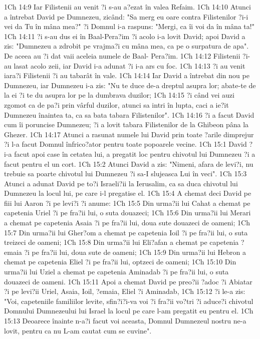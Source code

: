 1Ch 14:9  Iar Filistenii au venit ?i s-au a?ezat în valea Refaim.
1Ch 14:10  Atunci a întrebat David pe Dumnezeu, zicând: "Sa merg eu oare contra Filistenilor ?i-i vei da Tu în mâna mea?" ?i Domnul i-a raspuns: "Mergi, ca îi voi da în mâna ta!"
1Ch 14:11  ?i s-au dus ei în Baal-Pera?im ?i acolo i-a lovit David; apoi David a zis: "Dumnezeu a zdrobit pe vrajma?i cu mâna mea, ca pe o surpatura de apa". De aceea au ?i dat vaii aceleia numele de Baal- Pera?im.
1Ch 14:12  Filistenii ?i-au lasat acolo zeii, iar David i-a adunat ?i i-a ars cu foc.
1Ch 14:13  ?i au venit iara?i Filistenii ?i au tabarât în vale.
1Ch 14:14  Iar David a întrebat din nou pe Dumnezeu, iar Dumnezeu i-a zis: "Nu te duce de-a dreptul asupra lor; abate-te de la ei ?i te du asupra lor pe la dumbrava duzilor;
1Ch 14:15  ?i când vei auzi zgomot ca de pa?i prin vârful duzilor, atunci sa intri în lupta, caci a ie?it Dumnezeu înaintea ta, ca sa bata tabara Filistenilor".
1Ch 14:16  ?i a facut David cum îi poruncise Dumnezeu; ?i a lovit tabara Filistenilor de la Ghibeon pâna la Ghezer.
1Ch 14:17  Atunci a rasunat numele lui David prin toate ?arile dimprejur ?i l-a facut Domnul înfrico?ator pentru toate popoarele vecine.
1Ch 15:1  David ?i-a facut apoi case în cetatea lui, a pregatit loc pentru chivotul lui Dumnezeu ?i a facut pentru el un cort.
1Ch 15:2  Atunci David a zis: "Nimeni, afara de levi?i, nu trebuie sa poarte chivotul lui Dumnezeu ?i sa-I slujeasca Lui în veci".
1Ch 15:3  Atunci a adunat David pe to?i Israeli?ii la Ierusalim, ca sa duca chivotul lui Dumnezeu la locul lui, pe care i-l pregatise el.
1Ch 15:4  A chemat deci David pe fiii lui Aaron ?i pe levi?i ?i anume:
1Ch 15:5  Din urma?ii lui Cahat a chemat pe capetenia Uriel ?i pe fra?ii lui, o suta douazeci;
1Ch 15:6  Din urma?ii lui Merari a chemat pe capetenia Asaia ?i pe fra?ii lui, doua sute douazeci de oameni;
1Ch 15:7  Din urma?ii lui Gher?om a chemat pe capetenia Ioil ?i pe fra?ii lui, o suta treizeci de oameni;
1Ch 15:8  Din urma?ii lui Eli?afan a chemat pe capetenia ?emaia ?i pe fra?ii lui, doua sute de oameni;
1Ch 15:9  Din urma?ii lui Hebron a chemat pe capetenia Eliel ?i pe fra?ii lui, optzeci de oameni;
1Ch 15:10  Din urma?ii lui Uziel a chemat pe capetenia Aminadab ?i pe fra?ii lui, o suta douazeci de oameni.
1Ch 15:11  Apoi a chemat David pe preo?ii ?adoc ?i Abiatar ?i pe levi?ii Uriel, Asaia, Ioil, ?emaia, Eliel ?i Aminadab,
1Ch 15:12  ?i le-a zis: "Voi, capeteniile familiilor levite, sfin?i?i-va voi ?i fra?ii vo?tri ?i aduce?i chivotul Domnului Dumnezeului lui Israel la locul pe care l-am pregatit eu pentru el.
1Ch 15:13  Deoarece înainte n-a?i facut voi aceasta, Domnul Dumnezeul nostru ne-a lovit, pentru ca nu L-am cautat cum se cuvine".
